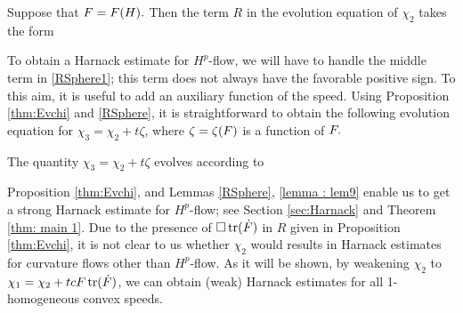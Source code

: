 \documentclass{amsart}
\begin{document}
\begin{lemma}\label{RSphere}
Suppose that $F=F(H).$ Then the term $R$ in the evolution equation of $\chi_2$ takes the form
\end{lemma}
To obtain a Harnack estimate for $H^{p}$-flow, we will have to handle the middle term in \cref{RSphere1}; this term does not always have the favorable positive sign. To this aim, it is useful to add an auxiliary function of the speed. Using Proposition \ref{thm:Evchi} and \cref{RSphere}, it is straightforward to obtain the following evolution equation for $\chi_3=\chi_2+t\zeta$, where $\zeta=\zeta(F)$ is a function of $F.$
\begin{lemma}\label{lemma : lem9}
The quantity
$\chi_3=\chi_2+t\zeta$
evolves according to
\end{lemma}
Proposition \ref{thm:Evchi}, and Lemmas \ref{RSphere}, \ref{lemma : lem9}  enable us to get a strong Harnack estimate for $H^{p}$-flow; see Section \ref{sec:Harnack} and Theorem \ref{thm: main 1}. Due to the presence of $\Box\operatorname{tr}(\dot{F})$ in $R$ given in Proposition \ref{thm:Evchi}, it is not clear to us whether $\chi_2$ would results in Harnack estimates for curvature flows other than $H^{p}$-flow. As it will be shown, by weakening $\chi_2$ to $\chi_1=\chi_2+tcF\operatorname{tr}(\dot{F})$,  we can obtain (weak) Harnack estimates for all 1-homogeneous convex speeds.
\end{document}
